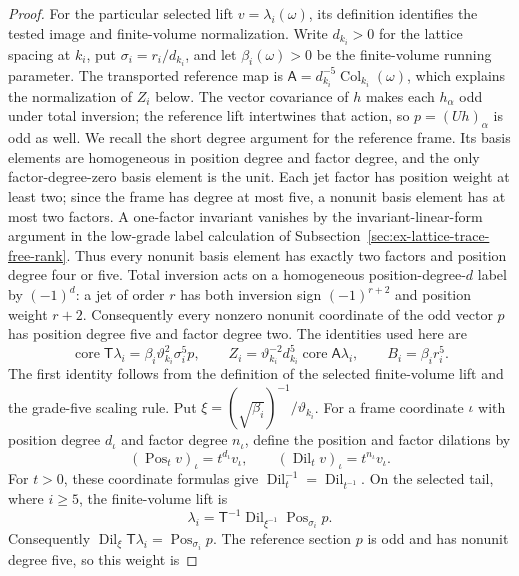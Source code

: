 \begin{proof}
For the particular selected lift $v=\lambda_i(\omega)$, its definition
identifies the tested image and finite-volume normalization. Write
$d_{k_i}>0$ for the lattice spacing at $k_i$, put
$\sigma_i=r_i/d_{k_i}$, and let $\beta_i(\omega)>0$ be the finite-volume
running parameter. The transported reference map is
$\mathsf A=d_{k_i}^{-5}\operatorname{Col}_{k_i}(\omega)$, which explains the
normalization of $Z_i$ below. The vector covariance of $h$ makes each $h_\alpha$ odd
under total inversion; the reference lift intertwines that action, so
$p=(Uh)_\alpha$ is odd as well. We recall the short degree argument for
the reference frame. Its basis elements are homogeneous in position degree
and factor degree, and the only factor-degree-zero basis element is the unit. Each
jet factor has position weight at least two; since the frame has degree at
most five, a nonunit basis element has at most two factors. A one-factor
invariant vanishes by the invariant-linear-form argument in the low-grade
label calculation of Subsection~\ref{sec:ex-lattice-trace-free-rank}. Thus every nonunit basis element has exactly two
factors and position degree four or five. Total inversion acts on a homogeneous
position-degree-$d$ label by $(-1)^d$: a jet of order $r$ has both inversion
sign $(-1)^{r+2}$ and position weight $r+2$. Consequently every nonzero
nonunit coordinate of the odd vector $p$ has position degree five and factor
degree two. The identities used here are
\begin{equation}
 \operatorname{core}\mathsf T\lambda_i=\beta_i\vartheta_{k_i}^2\sigma_i^5p,\qquad
 Z_i=\vartheta_{k_i}^{-2}d_{k_i}^5\operatorname{core}\mathsf A\lambda_i,\qquad
 B_i=\beta_i r_i^5.
 \label{eq:trace-sensor-finite-calibration}
\end{equation}
The first identity follows from the definition of the selected finite-volume
lift and the grade-five scaling rule. Put
$\xi=(\sqrt{\beta_i})^{-1}/\vartheta_{k_i}$. For a frame coordinate
$\iota$ with position degree $d_\iota$ and factor degree $n_\iota$,
define the position and factor dilations by
\[
 (\operatorname{Pos}_t v)_\iota=t^{d_\iota}v_\iota,\qquad
 (\operatorname{Dil}_t v)_\iota=t^{n_\iota}v_\iota.
\]
For $t>0$, these coordinate formulas give
$\operatorname{Dil}_t^{-1}=\operatorname{Dil}_{t^{-1}}$. On the selected
tail, where $i\ge5$, the finite-volume lift is
\[
 \lambda_i=\mathsf T^{-1}\operatorname{Dil}_{\xi^{-1}}
                    \operatorname{Pos}_{\sigma_i}p.
\]
Consequently $\operatorname{Dil}_\xi\mathsf T\lambda_i=\operatorname{Pos}_{\sigma_i}p$.
The reference
section $p$ is odd and has nonunit degree five, so this weight is

\end{proof}
